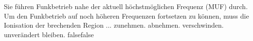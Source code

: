     {Sie führen Funkbetrieb nahe der aktuell höchstmöglichen Frequenz (MUF) durch. Um den Funkbetrieb auf noch höheren Frequenzen fortsetzen zu können, muss die Ionisation der brechenden Region ...}
    {zunehmen.}
    {abnehmen.}
    {verschwinden.}
    {unverändert bleiben.}
    {false}{false}